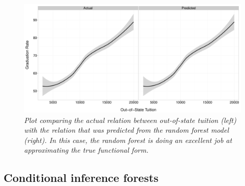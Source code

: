 \begin{figure}[h]
  \centering
  \includegraphics[width=4.5in]{Figures/Chapter02/testcheck_plot.pdf}
  \caption[Comparing the actual relation between out-of-state tuition with the relationship that was predicted with the random forest model.]{\textit{Plot comparing the actual relation between out-of-state tuition (left) with the relation that was predicted from the random forest model (right). In this case, the random forest is doing an excellent job at approximating the true functional form.}}
  \label{fig:testcheck}
\end{figure}




\subsection{Conditional inference forests}

